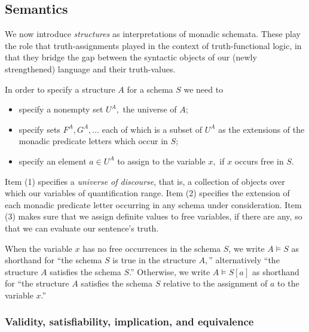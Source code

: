 \subsection{Semantics}

We now introduce \emph{structures} as interpretations of monadic schemata. These play the role that truth-assignments played in the context of truth-functional logic, in that they bridge the gap between the syntactic objects of our (newly strengthened) language and their truth-values.

In order to specify a structure $A$ for a schema $S$ we need to
\begin{itemize}
\item specify a nonempty set $U^A,$ the universe of $A$;
\item specify sets $F^A, G^A, \ldots $ each of which is a subset of $U^A$ as
the extensions of the monadic predicate letters which occur in $S$;
\item specify an element $a \in U^A$ to assign to the variable $x,$ if $x$
occurs free in $S.$ 
\end{itemize}

\begin{aside}
    Item (1) specifies a \emph{universe of discourse}, that is, a collection of objects over which our variables of quantification range. %
    Item (2) specifies the extension of each monadic predicate letter occurring in any schema under consideration. %
    Item (3) makes sure that we assign definite values to free variables, if there are any, so that we can evaluate our sentence's truth. 
\end{aside}

When the variable $x$ has no free occurrences in the schema $S$, we write $A \models S$ as shorthand for ``the schema $S$ is true in the
structure $A,$'' alternatively ``the structure $A$ satisfies the schema $S$.'' Otherwise, we write $A\models S[a]$ as shorthand for ``the structure $A$ satisfies the schema $S$ relative to the assignment of $a$ to the variable $x$.'' 


\subsubsection*{Validity, satisfiability, implication, and equivalence}

